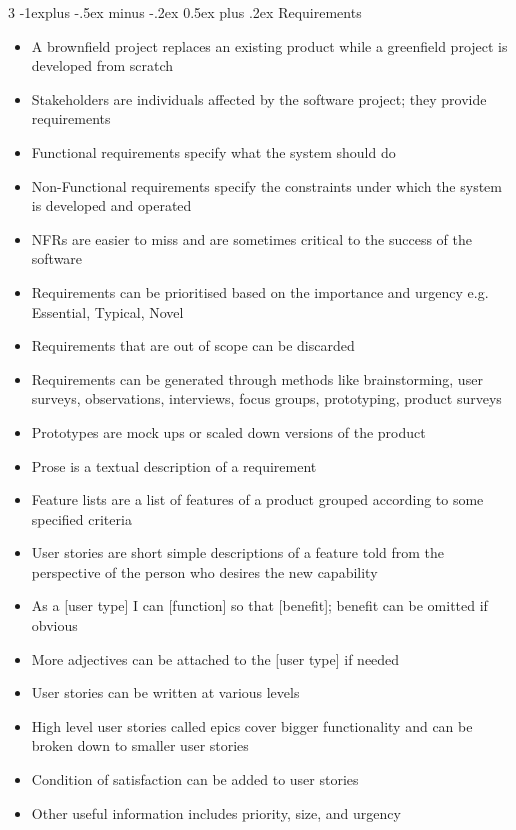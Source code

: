 \documentclass[10pt, landscape]{article}
\makeatletter
\renewcommand{\section}{\@startsection{section}{1}{0mm}%
                                {-1ex plus -.5ex minus -.2ex}%
                                {0.5ex plus .2ex}%
                                {\normalfont\large\bfseries}}
\renewcommand{\section}{\@startsection{section}{2}{0mm}%
                                {-1explus -.5ex minus -.2ex}%
                                {0.5ex plus .2ex}%
                                {\normalfont\normalsize\bfseries}}
\makeatother
\begin{document}
\begin{multicols*}{3}
\section{Requirements}
\begin{itemize}
    \item A brownfield project replaces an existing product while a greenfield project is developed from scratch
    \item Stakeholders are individuals affected by the software project; they provide requirements
    \item Functional requirements specify what the system should do
    \item Non-Functional requirements specify the constraints under which the system is developed and operated
    \item NFRs are easier to miss and are sometimes critical to the success of the software
    \item Requirements can be prioritised based on the importance and urgency e.g. Essential, Typical, Novel
    \item Requirements that are out of scope can be discarded
    \item Requirements can be generated through methods like brainstorming, user surveys, observations, interviews, focus groups, prototyping, product surveys
    \item Prototypes are mock ups or scaled down versions of the product
    \item Prose is a textual description of a requirement
    \item Feature lists are a list of features of a product grouped according to some specified criteria
    \item User stories are short simple descriptions of a feature told from the perspective of the person who desires the new capability
    \item As a [user type] I can [function] so that [benefit]; benefit can be omitted if obvious
    \item More adjectives can be attached to the [user type] if needed
    \item User stories can be written at various levels
    \item High level user stories called epics cover bigger functionality and can be broken down to smaller user stories
    \item Condition of satisfaction can be added to user stories
    \item Other useful information includes priority, size, and urgency

\end{itemize}
\end{multicols*}
\end{document}
